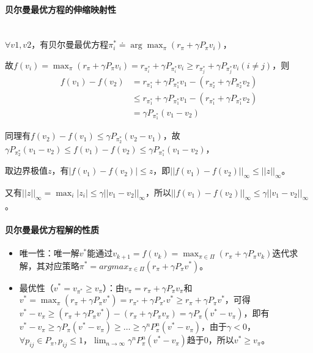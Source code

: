 \documentclass[
12pt, %
a4paper, 
oneside, %
]{scrartcl}
\begin{document}
{\paragraph{贝尔曼最优方程的伸缩映射性}~\\

$ \forall v1,v2 $，有贝尔曼最优方程$ \pi_i^* \doteq \arg \max_{\pi}(r_\pi + \gamma P_\pi v_i) $，

故$ f(v_i) = \max_{\pi}(r_\pi + \gamma P_\pi v_i) = r_{\pi_i^*} + \gamma P_{\pi_i^*} v_i \geq r_{\pi_j^*} + \gamma P_{\pi_j^*} v_i (i \neq j) $，则
\begin{align*}
f(v_1) - f(v_2) 
&= r_{\pi_1^*} + \gamma P_{\pi_1^*} v_1 - (r_{\pi_2^*} + \gamma P_{\pi_2^*} v_2) \\
&\leq r_{\pi_1^*} + \gamma P_{\pi_1^*} v_1 - (r_{\pi_1^*} + \gamma P_{\pi_1^*} v_2) \\
&= \gamma P_{\pi_1^*} (v_1 - v_2)
\end{align*}

同理有$ f(v_2) - f(v_1) \leq \gamma P_{\pi_2^*} (v_2 - v_1) $，故$ \gamma P_{\pi_2^*} (v_1 - v_2) \leq f(v_1) - f(v_2) \leq \gamma P_{\pi_1^*} (v_1 - v_2) $，

取边界极值$ z $，有$ |f(v_1) - f(v_2)| \leq z $，即$ ||f(v_1) - f(v_2)||_\infty \leq ||z||_\infty $。

又有$ ||z||_\infty = \max_i |z_i| \leq \gamma ||v_1 - v_2||_\infty $，所以$ ||f(v_1) - f(v_2)||_\infty \leq \gamma ||v_1 - v_2||_\infty $。
\paragraph{贝尔曼最优方程解的性质}
\begin{itemize}
\item 唯一性：唯一解$ v^* $能通过$ v_{k + 1} = f(v_k) = \max_{\pi \in \Pi} (r_\pi + \gamma P_\pi v_k) $迭代求解，其对应策略$ \pi^* = argmax_{\pi \in \Pi}(r_\pi + \gamma P_\pi v^*) $。
\item 最优性（$ v^* = v_{\pi^*} \geq v_{\pi} $）：由$ v_{\pi} = r_{\pi} + \gamma P_{\pi} v_{\pi} $和$ v^* = \max_{\pi}(r_{\pi} + \gamma P_{\pi} v^*) = r_{\pi^*} + \gamma P_{\pi^*} v^* \geq r_{\pi} + \gamma P_{\pi} v^* $，可得$ v^* - v_{\pi} \geq (r_{\pi} + \gamma P_{\pi} v^*) - (r_{\pi} + \gamma P_{\pi} v_{\pi}) = \gamma P_{\pi}(v^* - v_{\pi}) $，即有$ v^* - v_{\pi} \geq \gamma P_{\pi}(v^* - v_{\pi}) \geq \dots \geq \gamma^n P_{\pi}^n(v^* - v_{\pi}) $，由于$ \gamma < 0 $，$ \forall p_{ij} \in P_{\pi}, p_{ij} \leq 1 $，$ \lim_{n \to \infty} \gamma^n P_{\pi}^n(v^* - v_{\pi}) $趋于$ 0 $，所以$ v^* \geq v_{\pi} $。
\end{itemize}

}
\end{document}
